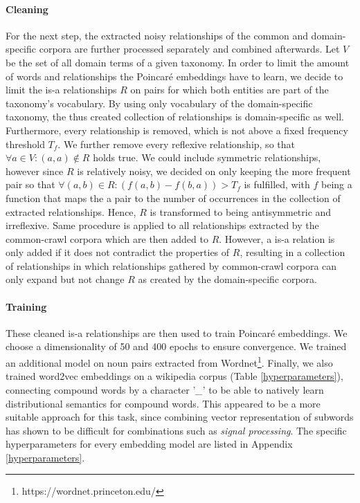 \documentclass[12pt, headsepline, a4paper]{scrartcl}
\begin{document}
\paragraph{Cleaning} For the next step, the extracted noisy relationships of the common and domain-specific corpora are further processed separately and combined afterwards. 
Let $V$ be the set of all domain terms of a given taxonomy. In order to limit the amount of words and relationships the Poincaré embeddings have to learn, we decide to limit the is-a relationships $R$ on pairs for which both entities are part of the taxonomy's vocabulary. By using only vocabulary of the domain-specific taxonomy, the thus created collection of relationships is domain-specific as well.
Furthermore, every relationship is removed, which is not above a fixed frequency threshold $T_{f}$. 
We further remove every reflexive relationship, so that $ \forall a \in V:(a,a)\not\in R$ holds true. We could include symmetric relationships, however since $R$ is relatively noisy, we decided on only keeping the more frequent pair so that $\forall (a,b) \in R : (f(a,b) - f(b,a)) > T_{f}$ is fulfilled, with $f$ being a function that maps the a pair to the number of occurrences in the collection of extracted relationships. Hence, $R$ is transformed to being antisymmetric and irreflexive. 
Same procedure is applied to all relationships extracted by the common-crawl corpora which are then added to $R$. However, a is-a relation is only added if it does not contradict the properties of $R$, resulting in a collection of relationships in which relationships gathered by common-crawl corpora can only expand but not change $R$ as created by the domain-specific corpora.

\paragraph{Training} These cleaned is-a relationships are then used to train Poincaré embeddings. We choose a dimensionality of 50 and 400 epochs to ensure convergence. We trained an additional model on noun pairs extracted from Wordnet\footnote{https://wordnet.princeton.edu/}. Finally, we also trained word2vec embeddings \citep{mikolov2013distributed} on a wikipedia corpus (Table \ref{hyperparameters}), connecting compound words by a character '\emph{\_}' to be able to natively learn distributional semantics for compound words. This appeared to be a more suitable approach for this task, since combining vector representation of subwords has shown to be difficult for combinations such as \emph{signal processing}. The specific hyperparameters for every embedding model are listed in Appendix \ref{hyperparameters}.
\end{document}
